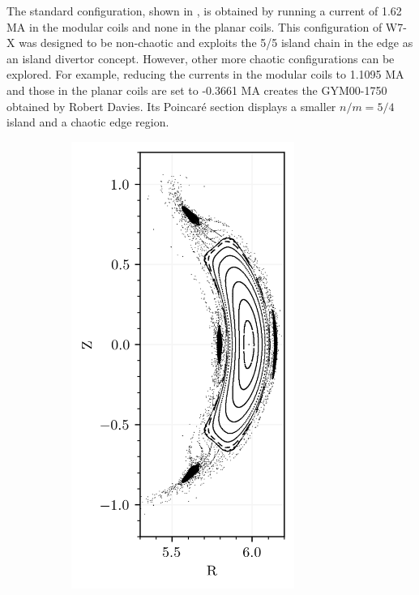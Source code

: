 The standard configuration, shown in , is obtained by running a current of 1.62 MA in the modular coils and none in the planar coils. This configuration of W7-X was designed to be non-chaotic and exploits the 5/5 island chain in the edge as an island divertor concept. However, other more chaotic configurations can be explored. For example, reducing the currents in the modular coils to 1.1095 MA and those in the planar coils are set to -0.3661 MA creates the GYM00-1750 obtained by Robert Davies. Its Poincar\'e section  displays a smaller $n/m = 5/4$ island and a chaotic edge region.

\begin{figure}[h!]
    \centering
    \begin{subfigure}[c]{0.49\textwidth}
        \centering
        \includegraphics[width=0.8\textwidth]{images/w7x-gym00-1750/gym00_1750.png}

\end{subfigure}
\end{figure}
